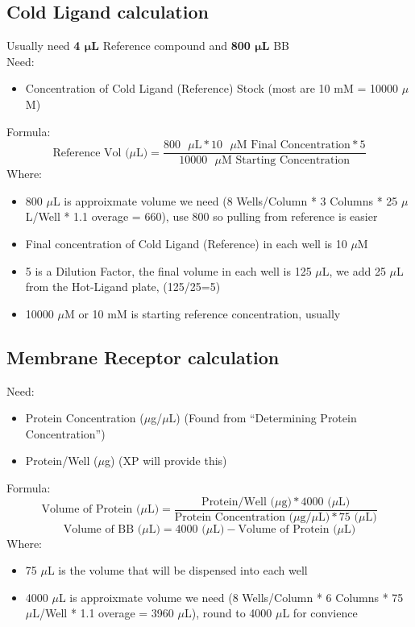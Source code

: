 \documentclass[12pt, letterpaper]{article}
\begin{document}
\subsection{Cold Ligand calculation}
Usually need \textbf{4 $\bm{\mu}$L} Reference compound and \textbf{800 $\bm{\mu}$L} BB
\\Need:
\begin{itemize}
    \item Concentration of Cold Ligand (Reference) Stock (most are 10 mM = 10000 $\mu$M)
\end{itemize}
Formula:
\[\text{Reference Vol ($\mu$L)} = \frac{800 \text{ $\mu$L} * 10 \text{ $\mu$M Final Concentration} * 5}{10000 \text{ $\mu$M Starting Concentration}}\]
Where:
\begin{itemize}
    \item 800 $\mu$L is approixmate volume we need (8 Wells/Column * 3 Columns * 25 $\mu$L/Well * 1.1 overage = 660), use 800 so pulling from reference is easier
    \item Final concentration of Cold Ligand (Reference) in each well is 10 $\mu$M
    \item 5 is a Dilution Factor, the final volume in each well is 125 $\mu$L, we add 25 $\mu$L from the Hot-Ligand plate, (125/25=5)
    \item 10000 $\mu$M or 10 mM is starting reference concentration, usually
\end{itemize}



\subsection{Membrane Receptor calculation}
Need:
\begin{itemize}
    \item Protein Concentration ($\mu$g/$\mu$L) (Found from ``Determining Protein Concentration'')
    \item Protein/Well ($\mu$g) (XP will provide this)
\end{itemize}
Formula:
\[\text{Volume of Protein ($\mu$L)} = \frac{\text{Protein/Well ($\mu$g)} * 4000 \text{ ($\mu$L)}}{ \text{Protein Concentration ($\mu$g/$\mu$L)} * 75 \text{ ($\mu$L)}}\]
\[\text{Volume of BB ($\mu$L)} = 4000 \text{ ($\mu$L)} - \text{Volume of Protein ($\mu$L)}\]
Where:
\begin{itemize}
    \item 75 $\mu$L is the volume that will be dispensed into each well
    \item 4000 $\mu$L is approixmate volume we need (8 Wells/Column * 6 Columns * 75 $\mu$L/Well * 1.1 overage = 3960 $\mu$L), round to 4000 $\mu$L for convience
\end{itemize}
\end{document}
